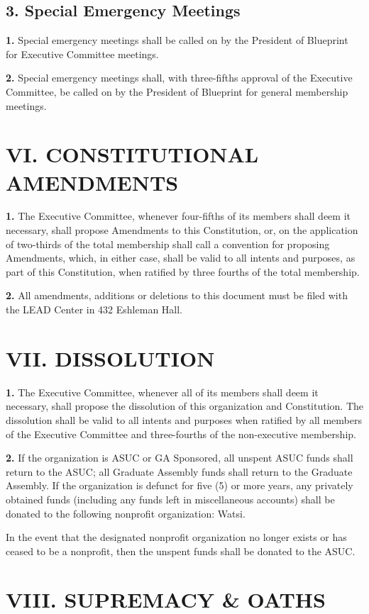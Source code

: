\documentclass{article}
\begin{document}
\subsection{3. Special Emergency Meetings}
\textbf{1.} Special emergency meetings shall be called on by the President of Blueprint for Executive Committee meetings.

\textbf{2.} Special emergency meetings shall, with three-fifths approval of the Executive Committee, be called on by the President of Blueprint for general membership meetings.

\section{VI. CONSTITUTIONAL AMENDMENTS}
\textbf{1.} The Executive Committee, whenever four-fifths of its members shall deem it necessary, shall propose Amendments to this Constitution, or, on the application of two-thirds of the total membership shall call a convention for proposing Amendments, which, in either case, shall be valid to all intents and purposes, as part of this Constitution, when ratified by three fourths of the total membership.

\textbf{2.} All amendments, additions or deletions to this document must be filed with the LEAD Center in 432 Eshleman Hall.

\section{VII. DISSOLUTION}
\textbf{1.} The Executive Committee, whenever all of its members shall deem it necessary, shall propose the dissolution of this organization and Constitution. The dissolution shall be valid to all intents and purposes when ratified by all members of the Executive Committee and three-fourths of the non-executive membership.

\textbf{2.} If the organization is ASUC or GA Sponsored, all unspent ASUC funds shall return to the ASUC; all Graduate Assembly funds shall return to the Graduate Assembly. If the organization is defunct for five (5) or more years, any privately obtained funds (including any funds left in miscellaneous accounts) shall be donated to the following nonprofit organization: Watsi.

In the event that the designated nonprofit organization no longer exists or has ceased to be a nonprofit, then the unspent funds shall be donated to the ASUC.

\section{VIII. SUPREMACY \& OATHS}
\end{document}
